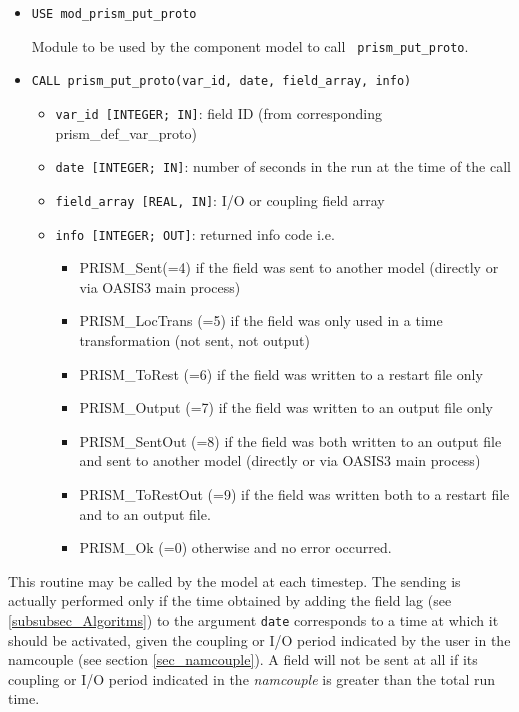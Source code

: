 \begin{itemize} 
\item {\tt USE  mod\_prism\_put\_proto}

Module to be used by the component model to call {\tt
  prism\_put\_proto}.
 
\item {\tt CALL prism\_put\_proto(var\_id, date, field\_array, info)}
\begin{itemize}
\item {\tt var\_id [INTEGER; IN]}: field ID (from
  corresponding prism\_def\_var\_proto)
\item {\tt date [INTEGER; IN]}: number of seconds in the run at the
time of the call
\item {\tt field\_array [REAL, IN]}: I/O or coupling field array 
\item {\tt info [INTEGER; OUT]}: returned info code i.e.
   \begin{itemize} 
      \item PRISM\_Sent(=4) if the field was sent to another model 
      (directly or via OASIS3 main process)
      \item PRISM\_LocTrans (=5) if the field was only used in a time
       transformation (not sent, not output)
      \item PRISM\_ToRest (=6) if the field was written to a restart file only
      \item PRISM\_Output (=7) if the field was written to an output file only
      \item PRISM\_SentOut (=8) if the field was both written to an output file
       and sent to another model (directly or via OASIS3 main process)
      \item PRISM\_ToRestOut (=9) if the field was written both to a
       restart file and to an output file.
      \item PRISM\_Ok (=0) otherwise and no error occurred.
   \end{itemize}
\end{itemize}
\end{itemize}

This routine may be called by the model at each timestep. The sending
is actually performed only if the time obtained by adding the field
lag (see \ref{subsubsec_Algoritms}) to the argument {\tt date}
corresponds to a time at which it should be activated, given the
coupling or I/O period indicated by the user in the namcouple (see
section \ref{sec_namcouple}). A field will not be sent at all if its
coupling or I/O period indicated in the {\it namcouple} is greater
than the total run time.

